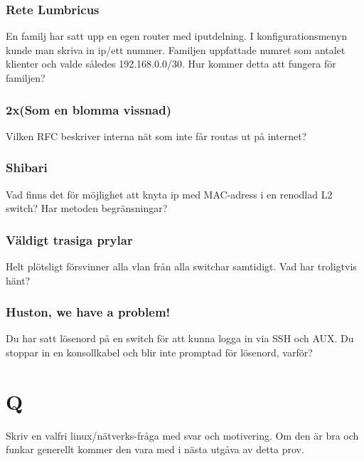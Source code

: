 \documentclass[a4paper]{report}
\begin{document}
\subsubsection{Rete Lumbricus}
En familj har satt upp en egen router med iputdelning. I konfigurationsmenyn kunde man skriva in ip/ett nummer. Familjen uppfattade numret som antalet klienter och valde således 192.168.0.0/30. Hur kommer detta att fungera för familjen?

\subsubsection{2x(Som en blomma vissnad)}
Vilken RFC beskriver interna nät som inte får routas ut på internet?

\subsubsection{Shibari}
Vad finns det för möjlighet att knyta ip med MAC-adress i en renodlad L2 switch? Har metoden begränsningar?

\subsubsection{Väldigt trasiga prylar}
Helt plötsligt försvinner alla vlan från alla switchar samtidigt. Vad har troligtvis hänt?

\subsubsection{Huston, we have a problem!}
Du har satt lösenord på en switch för att kunna logga in via SSH och AUX.
Du stoppar in en konsollkabel och blir inte promptad för lösenord, varför?


\section{Q}
Skriv en valfri linux/nätverks-fråga med svar och motivering. Om den är bra och funkar generellt kommer den vara med i nästa utgåva av detta prov.
\end{document}
